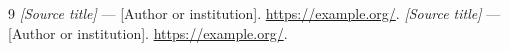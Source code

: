 {}
\begin{thebibliography}{9}
    \emph{[Source title]} --- [Author or institution]. \url{https://example.org/}.
    \emph{[Source title]} --- [Author or institution]. \url{https://example.org/}.
\end{thebibliography}

